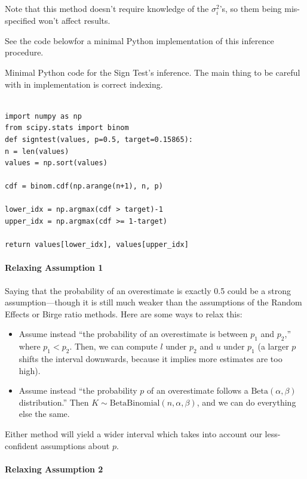 \documentclass[letterpaper,12pt]{article}
\begin{document}
Note that this method doesn't require knowledge of the $\sigma_i^2$'s, so them being mis-specified won't affect results.

See the code belowfor a minimal Python implementation of this inference procedure.

\begin{listing}[htbp]
\caption{Minimal Python code for the Sign Test's inference. The main thing to be careful with in implementation is correct indexing.}
\smaller
\begin{verbatim}

import numpy as np
from scipy.stats import binom
def signtest(values, p=0.5, target=0.15865):
n = len(values)
values = np.sort(values)

cdf = binom.cdf(np.arange(n+1), n, p)

lower_idx = np.argmax(cdf > target)-1
upper_idx = np.argmax(cdf >= 1-target)

return values[lower_idx], values[upper_idx]
\end{verbatim}
\end{listing}


\paragraph{Relaxing Assumption 1}\label{relaxing-assumption-1}

Saying that the probability of an overestimate is exactly 0.5 could be a strong assumption---though it is still much weaker than the assumptions of the Random Effects or Birge ratio methods. Here are some ways to relax this:

\begin{itemize}
\item
  Assume instead ``the probability of an overestimate is between $p_1$ and $p_2$,'' where $p_1<p_2$. Then, we can compute $l$ under $p_2$ and $u$ under $p_1$ (a larger $p$ shifts the interval downwards, because it implies more estimates are too high).
\item
  Assume instead ``the probability $p$ of an overestimate follows a $\mathrm{Beta}(\alpha,\beta)$ distribution.'' Then $K\sim\mathrm{BetaBinomial}(n,\alpha,\beta)$, and we can do everything else the same.
\end{itemize}

Either method will yield a wider interval which takes into account our less-confident assumptions about $p$.

\paragraph{Relaxing Assumption 2}
\label{sec:binom-ass-2}
\end{document}
